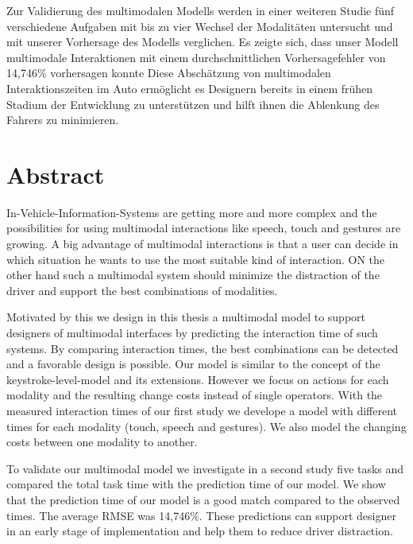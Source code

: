 \documentclass[11pt,a4paper,twoside]{book}
\begin{document}
Zur Validierung des multimodalen Modells werden in einer weiteren Studie fünf verschiedene Aufgaben mit bis zu vier Wechsel der Modalitäten untersucht und mit unserer Vorhersage des Modells verglichen.
Es zeigte sich, dass unser Modell multimodale Interaktionen mit einem durchschnittlichen Vorhersagefehler von 14,746\% vorhersagen konnte
Diese Abschätzung von multimodalen Interaktionszeiten im Auto ermöglicht es Designern bereits in einem frühen Stadium der Entwicklung zu unterstützen und hilft ihnen die Ablenkung des Fahrers zu minimieren.


\chapter*{Abstract}
In-Vehicle-Information-Systems are getting more and more complex and the possibilities for using multimodal interactions like speech, touch and gestures are growing.
A big advantage of multimodal interactions is that a user can decide in which situation he wants to use the most suitable kind of interaction.
ON the other hand such a multimodal system should minimize the distraction of the driver and support the best combinations of modalities.

Motivated by this we design in this thesis a multimodal model to support designers of multimodal interfaces by predicting the interaction time of such systems.
By comparing interaction times, the best combinations can be detected and a favorable design is possible.
Our model is similar to the concept of the keystroke-level-model and its extensions.
However we focus on actions for each modality and the resulting change costs instead of single operators.
With the measured interaction times of our first study we develope a model with different times for each modality (touch, speech and gestures).
We also model the changing costs between one modality to another.

To validate our multimodal model we investigate in a second study five tasks and compared the total task time with the prediction time of our model.
We show that the prediction time of our model is a good match compared to the observed times.
The average RMSE was 14,746\%.
These predictions can support designer in an early stage of implementation and help them to reduce driver distraction.

\clearpage
\end{document}
